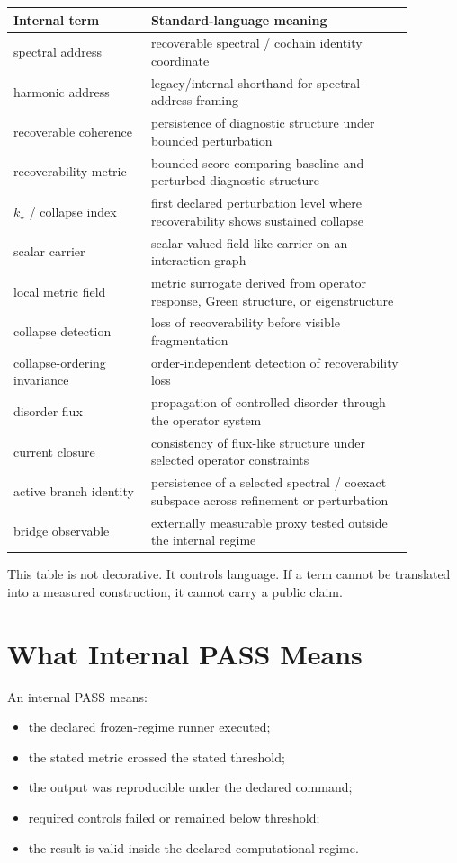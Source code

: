 \documentclass[11pt]{article}
\begin{document}
\begin{longtable}{p{0.30\linewidth}p{0.58\linewidth}}
\toprule
Internal term & Standard-language meaning \\
\midrule
\endhead
spectral address & recoverable spectral / cochain identity coordinate \\
harmonic address & legacy/internal shorthand for spectral-address framing \\
recoverable coherence & persistence of diagnostic structure under bounded perturbation \\
recoverability metric & bounded score comparing baseline and perturbed diagnostic structure \\
\(k_\star\) / collapse index & first declared perturbation level where recoverability shows sustained collapse \\
scalar carrier & scalar-valued field-like carrier on an interaction graph \\
local metric field & metric surrogate derived from operator response, Green structure, or eigenstructure \\
collapse detection & loss of recoverability before visible fragmentation \\
collapse-ordering invariance & order-independent detection of recoverability loss \\
disorder flux & propagation of controlled disorder through the operator system \\
current closure & consistency of flux-like structure under selected operator constraints \\
active branch identity & persistence of a selected spectral / coexact subspace across refinement or perturbation \\
bridge observable & externally measurable proxy tested outside the internal regime \\
\bottomrule
\end{longtable}

This table is not decorative. It controls language. If a term cannot be translated into a measured construction, it cannot carry a public claim.

\section{What Internal PASS Means}

An internal PASS means:

\begin{itemize}
\item the declared frozen-regime runner executed;
\item the stated metric crossed the stated threshold;
\item the output was reproducible under the declared command;
\item required controls failed or remained below threshold;
\item the result is valid inside the declared computational regime.
\end{itemize}
\end{document}
